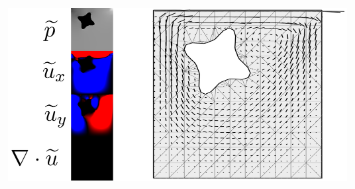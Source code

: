 
\begin{figure}[H]
    \centering
    \centerline{\includegraphics[width=0.8\textwidth]{figures/stokes/lid_driven_obstruction/figure.png}}
    \label{stokes_lid_driven_obstruction}
\end{figure}


% 
% 
% 
